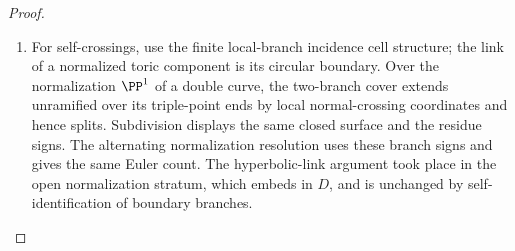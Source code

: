 \begin{proof}
\begin{enumerate}[label=\arabic*.,leftmargin=*]
\item For self-crossings, use the finite local-branch
incidence cell structure; the link of a normalized
toric component is its circular boundary. Over the
normalization $\PP^1$ of a double curve, the two-branch
cover extends unramified over its triple-point ends
by local normal-crossing coordinates and hence splits.
Subdivision
displays the same closed surface and the residue signs.
The alternating normalization resolution uses these
branch signs and gives the same Euler count. The
hyperbolic-link argument took place in the open
normalization stratum, which embeds in $D$, and is
unchanged by self-identification of boundary branches.
\end{enumerate}
\end{proof}